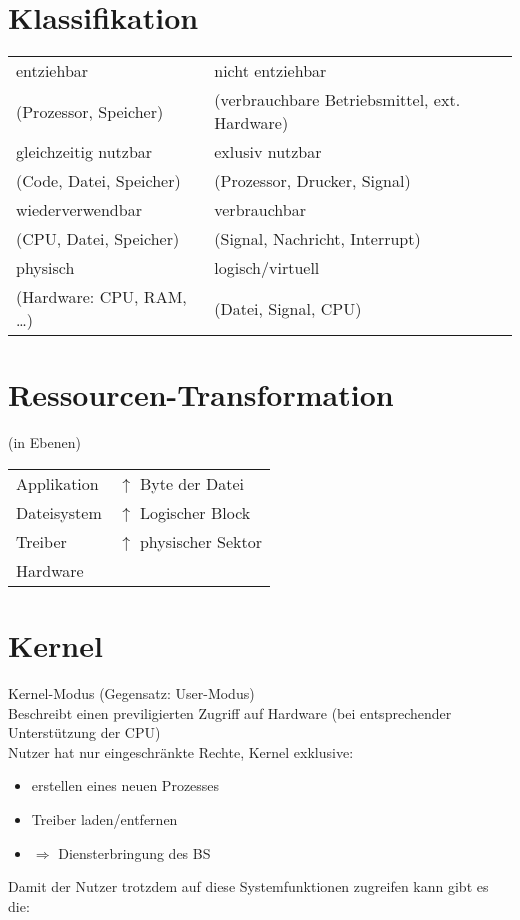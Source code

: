 \documentclass{scrreprt}
\renewcommand{\imptnt}[1]{#1}
\begin{document}
\section{Klassifikation}
\begin{tabular}{l | l}
\imptnt{entziehbar} & \imptnt{nicht entziehbar}\\
(Prozessor, Speicher) & (verbrauchbare Betriebsmittel, ext. Hardware)\\
\hline
\imptnt{gleichzeitig nutzbar} & \imptnt{exlusiv nutzbar}\\
(Code, Datei, Speicher) & (Prozessor, Drucker, Signal)\\
\hline
\imptnt{wiederverwendbar} & \imptnt{verbrauchbar}\\
(CPU, Datei, Speicher) & (Signal, Nachricht, Interrupt)\\
\hline
\imptnt{physisch} & \imptnt{logisch/virtuell}\\
(Hardware: CPU, RAM, …) & (Datei, Signal, CPU)
\end{tabular}
\section{Ressourcen-Transformation}
(in Ebenen)\\
\begin{tabular}{l | l}
Applikation & $\uparrow$ Byte der Datei\\
Dateisystem & $\uparrow$ Logischer Block\\
Treiber & $\uparrow$ physischer Sektor\\
Hardware & 
\end{tabular}

\section{Kernel}
\imptnt{Kernel-Modus} (Gegensatz: User-Modus)\\
Beschreibt einen previligierten Zugriff auf Hardware (bei entsprechender Unterstützung der CPU)\\
Nutzer hat nur eingeschränkte Rechte, Kernel exklusive:
\begin{itemize}
\item \imptnt{erstellen eines neuen Prozesses}
\item \imptnt{Treiber laden/entfernen}
\item $\Rightarrow$ \imptnt{Diensterbringung des BS}
\end{itemize}
Damit der Nutzer trotzdem auf diese Systemfunktionen zugreifen kann gibt es die:
\end{document}
